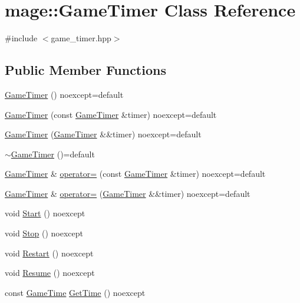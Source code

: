 \hypertarget{classmage_1_1_game_timer}{}\section{mage\+:\+:Game\+Timer Class Reference}
\label{classmage_1_1_game_timer}


{\ttfamily \#include $<$game\+\_\+timer.\+hpp$>$}

\subsection*{Public Member Functions}
\begin{DoxyCompactItemize}
\item 
\mbox{\hyperlink{classmage_1_1_game_timer_a171e5e335b8c2ba77ce80b64bcad9ef5}{Game\+Timer}} () noexcept=default
\item 
\mbox{\hyperlink{classmage_1_1_game_timer_a0c70f8245381120b6e334db078affa00}{Game\+Timer}} (const \mbox{\hyperlink{classmage_1_1_game_timer}{Game\+Timer}} \&timer) noexcept=default
\item 
\mbox{\hyperlink{classmage_1_1_game_timer_a5be12a14c07e264f402635a87b78b401}{Game\+Timer}} (\mbox{\hyperlink{classmage_1_1_game_timer}{Game\+Timer}} \&\&timer) noexcept=default
\item 
\mbox{\hyperlink{classmage_1_1_game_timer_a1ba81ccdb247f932e7a396f1ce773bbd}{$\sim$\+Game\+Timer}} ()=default
\item 
\mbox{\hyperlink{classmage_1_1_game_timer}{Game\+Timer}} \& \mbox{\hyperlink{classmage_1_1_game_timer_a9465e2d38d8810c2acb2cde2aafeaad1}{operator=}} (const \mbox{\hyperlink{classmage_1_1_game_timer}{Game\+Timer}} \&timer) noexcept=default
\item 
\mbox{\hyperlink{classmage_1_1_game_timer}{Game\+Timer}} \& \mbox{\hyperlink{classmage_1_1_game_timer_ae5489a5363fbf69592270a9f35f269c9}{operator=}} (\mbox{\hyperlink{classmage_1_1_game_timer}{Game\+Timer}} \&\&timer) noexcept=default
\item 
void \mbox{\hyperlink{classmage_1_1_game_timer_ab4eb362f71e15e1ca931d5bd0102db46}{Start}} () noexcept
\item 
void \mbox{\hyperlink{classmage_1_1_game_timer_a309768cb7a9dee1f4ac358bdba1842f4}{Stop}} () noexcept
\item 
void \mbox{\hyperlink{classmage_1_1_game_timer_a93108b016f2034da39e576067443d265}{Restart}} () noexcept
\item 
void \mbox{\hyperlink{classmage_1_1_game_timer_adbc9ce04e6c7f53f0b5ea6b5ce79a288}{Resume}} () noexcept
\item 
const \mbox{\hyperlink{classmage_1_1_game_time}{Game\+Time}} \mbox{\hyperlink{classmage_1_1_game_timer_a1598867084d2a6c8a7ec2d36e8e66aa4}{Get\+Time}} () noexcept
\end{DoxyCompactItemize}
